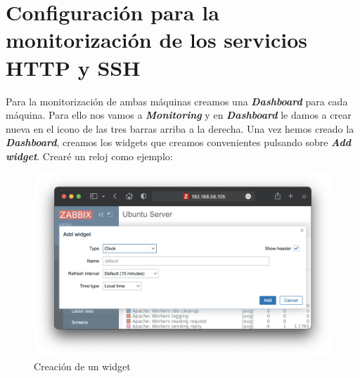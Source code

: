 \section{Configuración para la monitorización de los servicios HTTP y SSH}
Para la monitorización de ambas máquinas creamos una \textbf{\emph{Dashboard}} para cada máquina. Para ello nos vamos a \textbf{\emph{Monitoring}} y en \textbf{\emph{Dashboard}} le damos
a crear nueva en el icono de las tres barras arriba a la derecha. Una vez hemos creado la \textbf{\emph{Dashboard}}, creamos los widgets que creamos convenientes pulsando sobre
\textbf{\emph{Add widget}}. Crearé un reloj como ejemplo:
    \begin{figure}[H]
        \centering
        \includegraphics[scale=0.3]{images/widget.png}
        \caption{Creación de un widget}
        \label{fig:widget}
    \end{figure}

